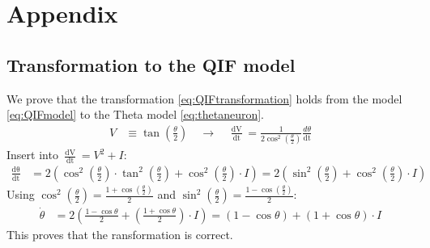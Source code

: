 
\newpage
\appendix
\section{Appendix} \label{sec:Appendix}

\subsection{Transformation to the QIF model} \label{app:TransformationToQIF}
We prove that the transformation \eqref{eq:QIFtransformation} holds from the \QIF model \eqref{eq:QIFmodel} to the Theta model \eqref{eq:thetaneuron}.
\begin{align*}
V &\equiv \tan \left( \frac{\theta}{2} \right) \quad \longrightarrow \quad
\frac{\mathop{d V}}{\mathop{d t}} = \frac{1}{2 \cos ^{2}\left(\frac{\theta}{2}\right)} \frac{d \theta}{ \mathop{d t}}
\end{align*}
Insert into $\frac{\mathop{d V}}{\mathop{d t}}= V^2 + I$:
\begin{align*}
\frac{\mathop{d \theta}}{\mathop{d t}} &= 2\left(\cos ^{2}\left(\frac{\theta}{2}\right) \cdot \tan ^{2}\left(\frac{\theta}{2}\right)+\cos ^{2}\left(\frac{\theta}{2}\right) \cdot I \right) = 2\left(\sin ^{2}\left(\frac{\theta}{2}\right)+\cos ^{2}\left(\frac{\theta}{2}\right) \cdot I \right)
\end{align*}
Using $\cos ^{2}\left(\frac{\theta}{2}\right) = \frac{1+\cos \left(\frac{\theta}{2}\right)}{2}$ and $\sin ^{2}\left(\frac{\theta}{2}\right)=\frac{1-\cos \left(\frac{\theta}{2}\right)}{2}$:
\begin{align*}
\dot{\theta} &=2\left(\frac{1-\cos \theta}{2}+\left(\frac{1+\cos \theta}{2}\right) \cdot I \right) =(1-\cos \theta)+(1+\cos \theta) \cdot I
\end{align*}
This proves that the ransformation is correct.

 
